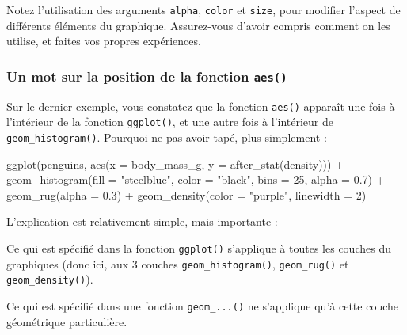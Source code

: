 \documentclass[
  a4paper,
  DIV=11,
  numbers=noendperiod,
  oneside]{scrreprt}
\newenvironment{Shaded}{}{}
\newcommand{\AttributeTok}[1]{\textcolor[rgb]{0.84,0.23,0.29}{#1}}
\newcommand{\DecValTok}[1]{\textcolor[rgb]{0.00,0.36,0.77}{#1}}
\newcommand{\FloatTok}[1]{\textcolor[rgb]{0.00,0.36,0.77}{#1}}
\newcommand{\FunctionTok}[1]{\textcolor[rgb]{0.44,0.26,0.76}{#1}}
\newcommand{\NormalTok}[1]{\textcolor[rgb]{0.14,0.16,0.18}{#1}}
\newcommand{\SpecialCharTok}[1]{\textcolor[rgb]{0.00,0.36,0.77}{#1}}
\newcommand{\StringTok}[1]{\textcolor[rgb]{0.01,0.18,0.38}{#1}}
\begin{document}
Notez l'utilisation des arguments \texttt{alpha}, \texttt{color} et
\texttt{size}, pour modifier l'aspect de différents éléments du
graphique. Assurez-vous d'avoir compris comment on les utilise, et
faites vos propres expériences.

\subsubsection{\texorpdfstring{Un mot sur la position de la fonction
\texttt{aes()}}{Un mot sur la position de la fonction aes()}}\label{un-mot-sur-la-position-de-la-fonction-aes}

Sur le dernier exemple, vous constatez que la fonction \texttt{aes()}
apparaît une fois à l'intérieur de la fonction \texttt{ggplot()}, et une
autre fois à l'intérieur de \texttt{geom\_histogram()}. Pourquoi ne pas
avoir tapé, plus simplement :

\begin{Shaded}
\begin{Highlighting}[]
\FunctionTok{ggplot}\NormalTok{(penguins, }\FunctionTok{aes}\NormalTok{(}\AttributeTok{x =}\NormalTok{ body\_mass\_g, }\AttributeTok{y =} \FunctionTok{after\_stat}\NormalTok{(density))) }\SpecialCharTok{+}
  \FunctionTok{geom\_histogram}\NormalTok{(}\AttributeTok{fill =} \StringTok{"steelblue"}\NormalTok{, }\AttributeTok{color =} \StringTok{"black"}\NormalTok{,}
                 \AttributeTok{bins =} \DecValTok{25}\NormalTok{, }\AttributeTok{alpha =} \FloatTok{0.7}\NormalTok{) }\SpecialCharTok{+}
  \FunctionTok{geom\_rug}\NormalTok{(}\AttributeTok{alpha =} \FloatTok{0.3}\NormalTok{) }\SpecialCharTok{+}
  \FunctionTok{geom\_density}\NormalTok{(}\AttributeTok{color =} \StringTok{"purple"}\NormalTok{, }\AttributeTok{linewidth =} \DecValTok{2}\NormalTok{)}
\end{Highlighting}
\end{Shaded}

L'explication est relativement simple, mais importante :

\begin{tcolorbox}[enhanced jigsaw, colbacktitle=quarto-callout-important-color!10!white, left=2mm, leftrule=.75mm, titlerule=0mm, bottomtitle=1mm, colback=white, breakable, arc=.35mm, bottomrule=.15mm, toprule=.15mm, toptitle=1mm, opacitybacktitle=0.6, title=\textcolor{quarto-callout-important-color}{\faExclamation}\hspace{0.5em}{Important}, coltitle=black, rightrule=.15mm, opacityback=0, colframe=quarto-callout-important-color-frame]

Ce qui est spécifié dans la fonction \texttt{ggplot()} s'applique à
toutes les couches du graphiques (donc ici, aux 3 couches
\texttt{geom\_histogram()}, \texttt{geom\_rug()} et
\texttt{geom\_density()}).

Ce qui est spécifié dans une fonction \texttt{geom\_...()} ne s'applique
qu'à cette couche géométrique particulière.

\end{tcolorbox}
\end{document}
